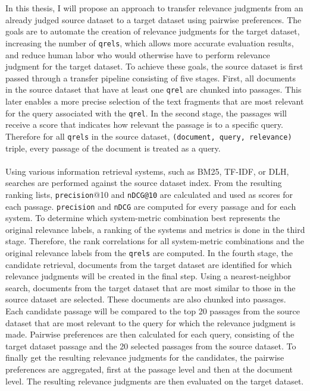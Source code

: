 \\\\
In this thesis, I will propose an approach to transfer relevance judgments from an already judged source dataset to a target dataset using pairwise preferences. The goals are to automate the creation of relevance judgments for the target dataset, increasing the number of \texttt{qrels}, which allows more accurate evaluation results, and reduce human labor who would otherwise have to perform relevance judgment for the target dataset. To achieve these goals, the source dataset is first passed through a transfer pipeline consisting of five stages. First, all documents in the source dataset that have at least one \texttt{qrel} are chunked into passages. This later enables a more precise selection of the text fragments that are most relevant for the query associated with the \texttt{qrel}. In the second stage, the passages will receive a score that indicates how relevant the passage is to a specific query. Therefore for all \texttt{qrels} in the source dataset, \texttt{(document, query, relevance)} triple, every passage of the document is treated as a query.
\\\\
Using various information retrieval systems, such as BM25, TF-IDF, or DLH, searches are performed against the source dataset index. From the resulting ranking lists, \texttt{precision}@10 and \texttt{nDCG@10} are calculated and used as scores for each passage. \texttt{precision} and \texttt{nDCG} are computed for every passage and for each system. To determine which system-metric combination best represents the original relevance labels, a ranking of the systems and metrics is done in the third stage. Therefore, the rank correlations for all system-metric combinations and the original relevance labels from the \texttt{qrels} are computed. In the fourth stage, the candidate retrieval, documents from the target dataset are identified for which relevance judgments will be created in the final step. Using a nearest-neighbor search, documents from the target dataset that are most similar to those in the source dataset are selected. These documents are also chunked into passages. Each candidate passage will be compared to the top 20 passages from the source dataset that are most relevant to the query for which the relevance judgment is made. Pairwise preferences are then calculated for each query, consisting of the target dataset passage and the 20 selected passages from the source dataset. To finally get the resulting relevance judgments for the candidates, the pairwise preferences are aggregated, first at the passage level and then at the document level. The resulting relevance judgments are then evaluated on the target dataset.
